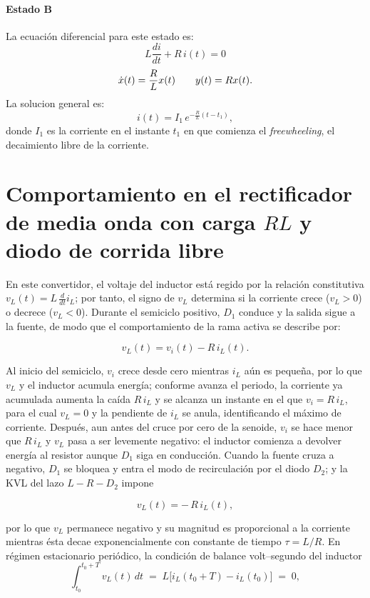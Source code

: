 \documentclass[conference]{IEEEtran}
\begin{document}
\paragraph{Estado B}
La ecuación diferencial para este estado es:
\[
L\frac{di}{dt} + R\,i(t) = 0
\]
\[
\dot{x}(t)
=
\-\dfrac{R}{L}
x(t)
\qquad
y(t)=Rx(t).
\]
La solucion general es:
\[
i(t)=I_1\,e^{-\frac{R}{L}(t-t_1)},
\]
donde \(I_1\) es la corriente en el instante \(t_1\) en que comienza el \emph{freewheeling}, el decaimiento libre de la corriente.

\section{Comportamiento en el rectificador de media onda con carga $RL$ y diodo de corrida libre}
En este convertidor, el voltaje del inductor está regido por la relación constitutiva $v_L(t)=L\,\tfrac{d}{dt}i_L$; por tanto, el signo de $v_L$ determina si la corriente crece ($v_L>0$) o decrece ($v_L<0$). Durante el semiciclo positivo, $D_1$ conduce y la salida sigue a la fuente, de modo que el comportamiento de la rama activa se describe por:

\begin{equation*}
	v_L(t)=v_i(t)-R\,i_L(t).
\end{equation*}

Al inicio del semiciclo, $v_i$ crece desde cero mientras $i_L$ aún es pequeña, por lo que $v_L$ y el inductor acumula energía; conforme avanza el periodo, la corriente ya acumulada aumenta la caída $R\,i_L$ y se alcanza un instante en el que $v_i=R\,i_L$, para el cual $v_L=0$ y la pendiente de $i_L$ se anula, identificando el máximo de corriente. Después, aun antes del cruce por cero de la senoide, $v_i$ se hace menor que $R\,i_L$ y $v_L$ pasa a ser levemente negativo: el inductor comienza a devolver energía al resistor aunque $D_1$ siga en conducción. Cuando la fuente cruza a negativo, $D_1$ se bloquea y entra el modo de recirculación por el diodo $D_2$; y la KVL del lazo $L\!-\!R\!-\!D_2$ impone

\begin{equation*}
	v_L(t)=-\,R\,i_L(t),
\end{equation*}

por lo que $v_L$ permanece negativo y su magnitud es proporcional a la corriente mientras ésta decae exponencialmente con constante de tiempo $\tau=L/R$. En régimen estacionario periódico, la condición de balance volt–segundo del inductor
\begin{equation*}
	\int_{t_0}^{t_0+T} v_L(t)\,dt \;=\; L\big[i_L(t_0+T)-i_L(t_0)\big]\;=\;0,
\end{equation*}
\end{document}

